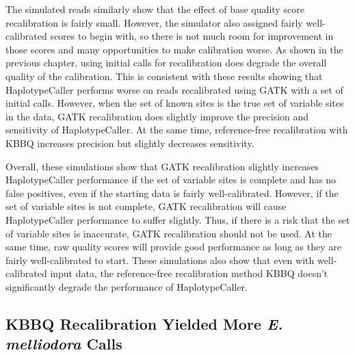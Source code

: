 The simulated reads similarly show that the effect of base quality score recalibration is fairly small. However, the simulator also assigned fairly well-calibrated scores to begin with, so there is not much room for improvement in those scores and many opportunities to make calibration worse. As shown in the previous chapter, using initial calls for recalibration does degrade the overall quality of the calibration. This is consistent with these results showing that HaplotypeCaller performs worse on reads recalibrated using GATK with a set of initial calls. However, when the set of known sites is the true set of variable sites in the data, GATK recalibration does slightly improve the precision and sensitivity of HaplotypeCaller. At the same time, reference-free recalibration with KBBQ increases precision but slightly decreases sensitivity.

Overall, these simulations show that GATK recalibration slightly increases HaplotypeCaller performance if the set of variable sites is complete and has no false positives, even if the starting data is fairly well-calibrated. However, if the set of variable sites is not complete, GATK recalibration will cause HaplotypeCaller performance to suffer slightly. Thus, if there is a risk that the set of variable sites is inaccurate, GATK recalibration should not be used. At the same time, raw quality scores will provide good performance as long as they are fairly well-calibrated to start. These simulations also show that even with well-calibrated input data, the reference-free recalibration method KBBQ doesn't significantly degrade the performance of HaplotypeCaller.

%





\subsection{KBBQ Recalibration Yielded More \textit{E. melliodora} Calls}

